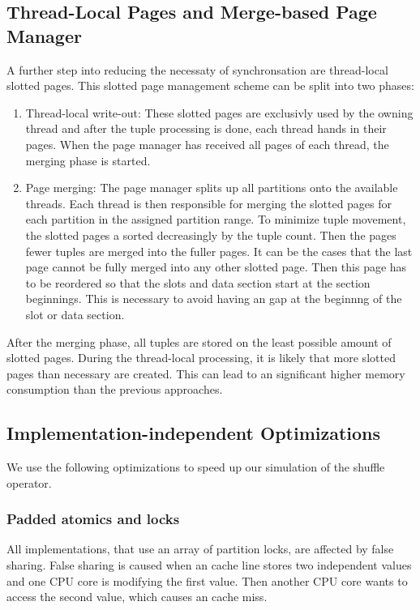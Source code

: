 \subsection{Thread-Local Pages and Merge-based Page Manager}\label{subsection-Thread-Local-Pages-Page-Manager}
A further step into reducing the necessaty of synchronsation are thread-local slotted pages.
This slotted page management scheme can be split into two phases:
\begin{enumerate}
  \item Thread-local write-out: These slotted pages are exclusivly used by the owning thread and after the tuple processing is done, each thread hands in their pages.
        When the page manager has received all pages of each thread, the merging phase is started.

  \item Page merging: The page manager splits up all partitions onto the available threads.
        Each thread is then responsible for merging the slotted pages for each partition in the assigned partition range.
        To minimize tuple movement, the slotted pages a sorted decreasingly by the tuple count.
        Then the pages fewer tuples are merged into the fuller pages.
        It can be the cases that the last page cannot be fully merged into any other slotted page.
        Then this page has to be reordered so that the slots and data section start at the section beginnings.
        This is necessary to avoid having an gap at the beginnng of the slot or data section.
\end{enumerate}
After the merging phase, all tuples are stored on the least possible amount of slotted pages.
During the thread-local processing, it is likely that more slotted pages than necessary are created.
This can lead to an significant higher memory consumption than the previous approaches.
\subsection{Implementation-independent Optimizations}
We use the following optimizations to speed up our simulation of the shuffle operator.
\subsubsection{Padded atomics and locks}
All implementations, that use an array of partition locks, are affected by false sharing.
False sharing is caused when an cache line stores two independent values and one \ac{CPU} core is modifying the first value.
Then another CPU core wants to access the second value, which causes an cache miss.

